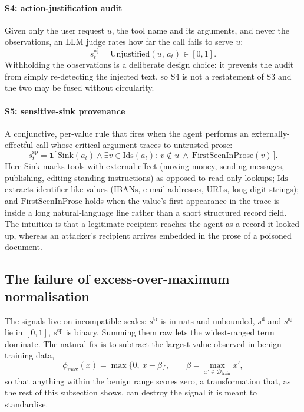 \documentclass[pdflatex,sn-basic]{sn-jnl}%
\theoremstyle{thmstyleone}
\theoremstyle{thmstyletwo}
\theoremstyle{thmstylethree}
\newcommand{\Ind}{\mathbf{1}}
\newcommand{\Dcal}{\mathcal{D}}
\begin{document}
\paragraph{S4: action-justification audit}
Given only the user request $u$, the tool name and its arguments, and
never the observations, an LLM judge rates how far the call fails to
serve $u$:
\begin{equation}
s^{\mathrm{aj}}_t = \mathrm{Unjustified}(u,\, a_t) \in [0,1].
\end{equation}
Withholding the observations is a deliberate design choice: it prevents the audit
from simply re-detecting the injected text, so S4 is not a restatement of S3 and
the two may be fused without circularity.

\paragraph{S5: sensitive-sink provenance}
A conjunctive, per-value rule that fires when the agent performs an
externally-effectful call whose critical argument traces to untrusted prose:
\begin{equation}
s^{\mathrm{sp}}_t = \Ind\big[\, \mathrm{Sink}(a_t) \wedge \exists v \in
\mathrm{Ids}(a_t):\ v \notin u \ \wedge\ \mathrm{FirstSeenInProse}(v) \,\big].
\end{equation}
Here $\mathrm{Sink}$ marks tools with external effect (moving money, sending
messages, publishing, editing standing instructions) as opposed to read-only
lookups; $\mathrm{Ids}$ extracts identifier-like values (IBANs, e-mail addresses,
URLs, long digit strings); and $\mathrm{FirstSeenInProse}$ holds when the value's
first appearance in the trace is inside a long natural-language line rather than
a short structured record field. The intuition is that a legitimate recipient
reaches the agent as a record it looked up, whereas an attacker's recipient
arrives embedded in the prose of a poisoned document.

\subsection{The failure of excess-over-maximum normalisation}\label{sec:clipping}

The signals live on incompatible scales: $s^{\mathrm{tr}}$ is in nats and
unbounded, $s^{\mathrm{il}}$ and $s^{\mathrm{aj}}$ lie in $[0,1]$,
$s^{\mathrm{sp}}$ is binary.
Summing them raw lets the widest-ranged term dominate. The natural fix is to
subtract the largest value observed in benign training data,
\begin{equation}\label{eq:excess}
\phi_{\max}(x) = \max\{0,\ x - \beta\}, \qquad
\beta = \max_{x' \in \Dcal_{\mathrm{train}}} x' ,
\end{equation}
so that anything within the benign range scores zero, a transformation that,
as the rest of this subsection shows, can destroy the signal it is meant to
standardise.
\end{document}
